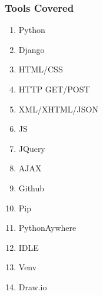 
\subsubsection{Tools Covered}
	
		\begin{multicols}{2} 
				\begin{enumerate}
					\item Python
					\item Django
					\item HTML/CSS
					\item HTTP GET/POST
					\item XML/XHTML/JSON
					\item JS
					\item JQuery
					\item AJAX
					\item Github
					\item Pip
					\item PythonAywhere
					\item IDLE
					\item Venv
					\item Draw.io
				\end{enumerate}
		\end{multicols}

